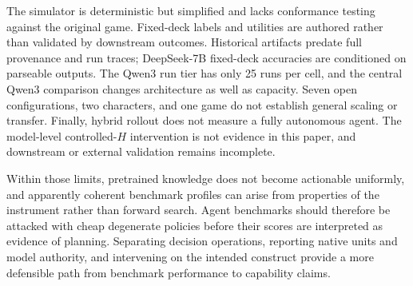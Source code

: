 \documentclass{article}
\begin{document}
The simulator is deterministic but simplified and lacks conformance testing against
the original game. Fixed-deck labels and utilities are authored rather than validated
by downstream outcomes. Historical artifacts predate full provenance and run traces;
DeepSeek-7B fixed-deck accuracies are conditioned on parseable outputs. The Qwen3 run
tier has only 25 runs per cell, and the central Qwen3 comparison changes architecture as
well as capacity. Seven open configurations, two characters, and one game do not
establish general scaling or transfer. Finally, hybrid rollout does not measure a fully
autonomous agent. The model-level controlled-$H$ intervention is not evidence in this
paper, and downstream or external validation remains incomplete.

Within those limits, pretrained knowledge does not become actionable uniformly, and
apparently coherent benchmark profiles can arise from properties of the instrument
rather than forward search. Agent benchmarks should therefore be attacked with cheap
degenerate policies before their scores are interpreted as evidence of planning.
Separating decision operations, reporting native units and model authority, and
intervening on the intended construct provide a more defensible path from benchmark
performance to capability claims.

\newpage


\end{document}
